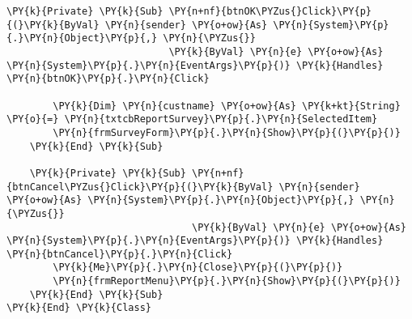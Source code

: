 \begin{Verbatim}[commandchars=\\\{\}]
    \PY{k}{Private} \PY{k}{Sub} \PY{n+nf}{btnOK\PYZus{}Click}\PY{p}{(}\PY{k}{ByVal} \PY{n}{sender} \PY{o+ow}{As} \PY{n}{System}\PY{p}{.}\PY{n}{Object}\PY{p}{,} \PY{n}{\PYZus{}}
                            \PY{k}{ByVal} \PY{n}{e} \PY{o+ow}{As} \PY{n}{System}\PY{p}{.}\PY{n}{EventArgs}\PY{p}{)} \PY{k}{Handles} \PY{n}{btnOK}\PY{p}{.}\PY{n}{Click}

        \PY{k}{Dim} \PY{n}{custname} \PY{o+ow}{As} \PY{k+kt}{String} \PY{o}{=} \PY{n}{txtcbReportSurvey}\PY{p}{.}\PY{n}{SelectedItem}
        \PY{n}{frmSurveyForm}\PY{p}{.}\PY{n}{Show}\PY{p}{(}\PY{p}{)}
    \PY{k}{End} \PY{k}{Sub}

    \PY{k}{Private} \PY{k}{Sub} \PY{n+nf}{btnCancel\PYZus{}Click}\PY{p}{(}\PY{k}{ByVal} \PY{n}{sender} \PY{o+ow}{As} \PY{n}{System}\PY{p}{.}\PY{n}{Object}\PY{p}{,} \PY{n}{\PYZus{}}
                                \PY{k}{ByVal} \PY{n}{e} \PY{o+ow}{As} \PY{n}{System}\PY{p}{.}\PY{n}{EventArgs}\PY{p}{)} \PY{k}{Handles} \PY{n}{btnCancel}\PY{p}{.}\PY{n}{Click}
        \PY{k}{Me}\PY{p}{.}\PY{n}{Close}\PY{p}{(}\PY{p}{)}
        \PY{n}{frmReportMenu}\PY{p}{.}\PY{n}{Show}\PY{p}{(}\PY{p}{)}
    \PY{k}{End} \PY{k}{Sub}
\PY{k}{End} \PY{k}{Class}
\end{Verbatim}

